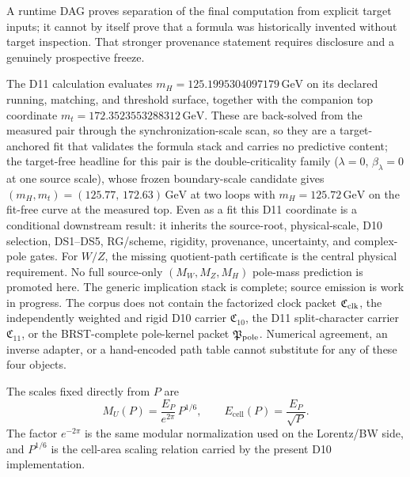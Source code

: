 \documentclass[11pt]{article}
\begin{document}
A runtime DAG proves separation of the final computation from explicit target
inputs; it cannot by itself prove that a formula was historically invented
without target inspection. That stronger provenance statement requires
disclosure and a genuinely prospective freeze.

The D11 calculation evaluates
\(m_H=125.1995304097179\,\mathrm{GeV}\) on its declared running, matching, and
threshold surface, together with the companion top coordinate
\(m_t=172.3523553288312\,\mathrm{GeV}\).  These are back-solved from the
measured pair through the synchronization-scale scan, so they are a
target-anchored fit that validates the formula stack and carries no predictive
content; the target-free headline for this pair is the double-criticality
family (\(\lambda=0\), \(\beta_\lambda=0\) at one source scale), whose frozen
boundary-scale candidate gives \((m_H,m_t)=(125.77,\,172.63)\,\mathrm{GeV}\) at
two loops with \(m_H=125.72\,\mathrm{GeV}\) on the fit-free curve at the
measured top.  Even as a fit this D11 coordinate is a conditional downstream
result: it inherits the source-root, physical-scale, D10 selection, DS1--DS5,
RG/scheme, rigidity, provenance, uncertainty, and complex-pole gates.  For \(W/Z\), the
missing quotient-path certificate is the central physical requirement. No
full source-only \((M_W,M_Z,M_H)\) pole-mass prediction is promoted here.
The generic implication stack is complete; source emission is work in progress.
The corpus does
not contain the factorized clock packet \(\mathfrak C_{\rm clk}\), the
independently weighted and rigid D10 carrier \(\mathfrak C_{10}\), the D11
split-character carrier \(\mathfrak C_{11}\), or the BRST-complete pole-kernel
packet \(\mathfrak P_{\rm pole}\). Numerical agreement, an inverse adapter, or
a hand-encoded path table cannot substitute for any of these four objects.

The scales fixed directly from \(P\) are
\[
M_U(P)=\frac{E_P}{e^{2\pi}}\,P^{1/6},
\qquad
E_{\mathrm{cell}}(P)=\frac{E_P}{\sqrt P}.
\]
The factor \(e^{-2\pi}\) is the same modular normalization used on the Lorentz/BW side, and \(P^{1/6}\) is the cell-area scaling relation carried by the present D10 implementation.
\end{document}
